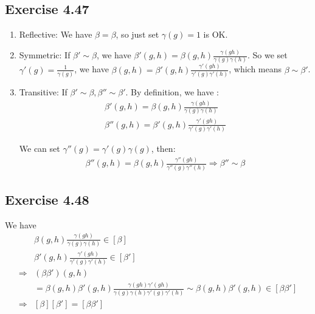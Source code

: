 \documentclass[]{ctexart}
\begin{document}
	\subsection{Exercise 4.47}
		\begin{enumerate}
			\item Reflective: We have $\beta=\beta$, so just set $\gamma(g) =1$ is OK.
			\item Symmetric: If $\beta'\sim \beta$, we have $\beta'(g,h) =\beta (g,h)\frac{\gamma (gh)}{\gamma (g)\gamma (h)}$. So we set $\gamma'(g)=\frac{1}{\gamma(g)}$, we have $\beta(g,h) =\beta '(g,h)\frac{\gamma' (gh)}{\gamma '(g)\gamma' (h)}$, which means $\beta\sim \beta'$.
			\item Transitive:  If $\beta'\sim \beta,\beta''\sim \beta'$. By definition, we have :
				\begin{equation*}
				\begin{aligned}
					\beta'(g,h) =\beta (g,h)\frac{\gamma (gh)}{\gamma (g)\gamma (h)}\\
					\beta''(g,h) =\beta' (g,h)\frac{\gamma' (gh)}{\gamma' (g)\gamma' (h)}
				\end{aligned}
				\end{equation*}
				
			We can set $\gamma''(g)=\gamma'(g)\gamma(g)$, then:
				\begin{equation*}
				\begin{aligned}
					\beta''(g,h) =\beta (g,h)\frac{\gamma'' (gh)}{\gamma'' (g)\gamma'' (h)}\Rightarrow \beta''\sim \beta
				\end{aligned}
				\end{equation*}
		\end{enumerate}
	
	\subsection{Exercise 4.48}
		We have 
			\begin{equation*}
			\begin{aligned}
				&\beta (g,h)\frac{\gamma (gh)}{\gamma (g)\gamma (h)}\in [\beta ]\\
				&\beta' (g,h)\frac{\gamma' (gh)}{\gamma' (g)\gamma' (h)}\in [\beta' ]\\
				\Rightarrow &(\beta \beta') (g,h)\\
				&=\beta (g,h)\beta' (g,h)\frac{\gamma (gh)\gamma' (gh)}{\gamma (g)\gamma (h)\gamma' (g)\gamma' (h)}\sim \beta (g,h)\beta' (g,h)\in [\beta \beta' ]\\
				\Rightarrow &[\beta ][\beta' ]=[\beta \beta' ]
			\end{aligned}
			\end{equation*}
		
\end{document}
